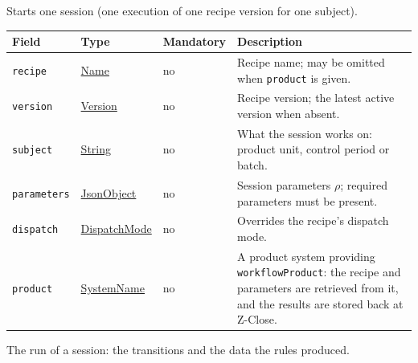 \documentclass[a4paper]{arrowhead}
\newcommand{\mref}[1]{{\textcolor{ArrowheadPurple}{\hyperref[sec:model:#1]{#1}}}}
\newcommand{\pref}[1]{{\textcolor{ArrowheadGrey}{\hyperref[sec:model:primitives:#1]{#1}}}}
\begin{document}
Starts one session (one execution of one recipe version for one subject).

{\small
\begin{longtable}{|p{3.7cm}|p{4.2cm}|p{1.6cm}|p{6.3cm}|}

\hline
\rowcolor{gray!33} Field & Type & Mandatory & Description \\ \hline
\endhead
\texttt{recipe} & \pref{Name} & no & Recipe name; may be omitted when \texttt{product} is given. \\ \hline
\texttt{version} & \pref{Version} & no & Recipe version; the latest active version when absent. \\ \hline
\texttt{subject} & \pref{String} & no & What the session works on: product unit, control period or batch. \\ \hline
\texttt{parameters} & \pref{JsonObject} & no & Session parameters $\rho$; required parameters must be present. \\ \hline
\texttt{dispatch} & \mref{DispatchMode} & no & Overrides the recipe's dispatch mode. \\ \hline
\texttt{product} & \pref{SystemName} & no & A product system providing \texttt{workflow\allowbreak{}Product}: the recipe and parameters are retrieved from it, and the results are stored back at Z-Close. \\ \hline
\end{longtable}
}

The run of a session: the transitions and the data the rules produced.
\end{document}
